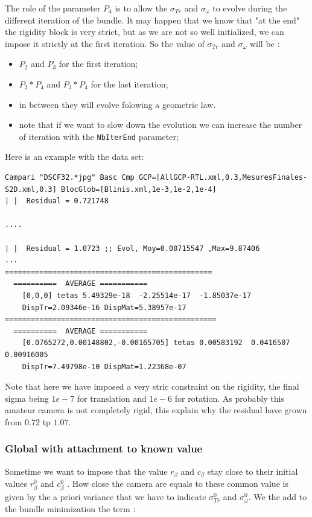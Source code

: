 The role of the parameter $P_4$ is to allow the  $\sigma_{Tr}$ and $\sigma_{\omega}$ to evolve during
the different iteration of the bundle. It may happen that we know that "at the end" the rigidity block
is very strict, but as we are not so well initialized, we can impose it strictly at the first iteration.
So the value of $\sigma_{Tr}$ and $\sigma_{\omega}$ will be :

\begin{itemize}
    \item $P_2$ and $P_3$ for the first iteration;
    \item $P_2*P_4$ and $P_3*P_4$ for the last iteration;
    \item in between they will evolve folowing a geometric law.
    \item note that if we want to slow down the evolution we can increase the number of iteration
          with the {\tt NbIterEnd} parameter;
\end{itemize}

Here is an example with the data set:

\begin{verbatim}
Campari "DSCF32.*jpg" Basc Cmp GCP=[AllGCP-RTL.xml,0.3,MesuresFinales-S2D.xml,0.3] BlocGlob=[Blinis.xml,1e-3,1e-2,1e-4]
| |  Residual = 0.721748

....

| |  Residual = 1.0723 ;; Evol, Moy=0.00715547 ,Max=9.87406
...
================================================
  ==========  AVERAGE =========== 
    [0,0,0] tetas 5.49329e-18  -2.25514e-17  -1.85037e-17
    DispTr=2.09346e-16 DispMat=5.38957e-17
=================================================
  ==========  AVERAGE =========== 
    [0.0765272,0.00148802,-0.00165705] tetas 0.00583192  0.0416507  0.00916005
    DispTr=7.49798e-10 DispMat=1.22368e-07
\end{verbatim}

Note that here we have imposed a very stric constraint on the rigidity, the final sigma being
$1e-7$ for translation and $1e-6$ for rotation. As probably this amateur camera is not completely
rigid, this explain why the residual have grown from $0.72$ tp $1.07$.


\subsubsection{Global with attachment to known value }

Sometime we want to impose that the value $r_\beta$ and $c_\beta$ stay close
to their initial values  $r^0_\beta$ and $c^0_\beta$ .
How close the camera are equals to these common value is given by the a priori
variance that we have to indicate  $\sigma^0_{Tr} $ and $\sigma^0_{\omega} $.
We the add to the bundle minimization the term :

